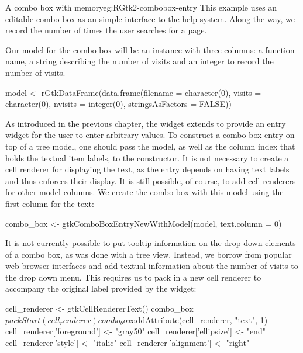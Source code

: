 \begin{example}{A combo box with memory}{eg:RGtk2-combobox-entry}
This example uses an editable combo box as an simple interface to the
\R\/ help system. Along the way, we record the number of times the
user searches for a page.

Our model for the combo box will be an  instance
with three columns: a function name, a string describing the
number of visits and an integer to record the number of visits. 
\begin{Schunk}
\begin{Sinput}
 model <- rGtkDataFrame(data.frame(filename = character(0), 
                                   visits = character(0), 
                                   nvisits = integer(0), 
                                   stringsAsFactors = FALSE))
\end{Sinput}
\end{Schunk}

As introduced in the previous chapter, the 
widget extends  to provide an entry widget for the
user to enter arbitrary values. To construct a combo box entry on top
of a tree model, one should pass the model, as well as the column
index that holds the textual item labels, to the
 constructor. It is not necessary to
create a cell renderer for displaying the text, as the entry depends
on having text labels and thus enforces their display. It is still
possible, of course, to add cell renderers for other model columns.
We create the combo box with this model using the first column for the
text:
\begin{Schunk}
\begin{Sinput}
 combo_box <- gtkComboBoxEntryNewWithModel(model, 
                                           text.column = 0)
\end{Sinput}
\end{Schunk}

It is not currently possible to put tooltip information on the drop
down elements of a combo box, as was done with a tree view. Instead,
we borrow from popular web browser interfaces and add textual
information about the number of visits to the drop down menu. This
requires us to pack in a new cell renderer to accompany the original
label provided by the  widget:
\begin{Schunk}
\begin{Sinput}
 cell_renderer <- gtkCellRendererText()
 combo_box$packStart(cell_renderer)
 combo_box$addAttribute(cell_renderer, "text", 1)
 cell_renderer['foreground'] <- "gray50"
 cell_renderer['ellipsize'] <- "end"
 cell_renderer['style'] <- "italic"
 cell_renderer['alignment'] <- "right"
\end{Sinput}
\end{Schunk}


\end{example}
